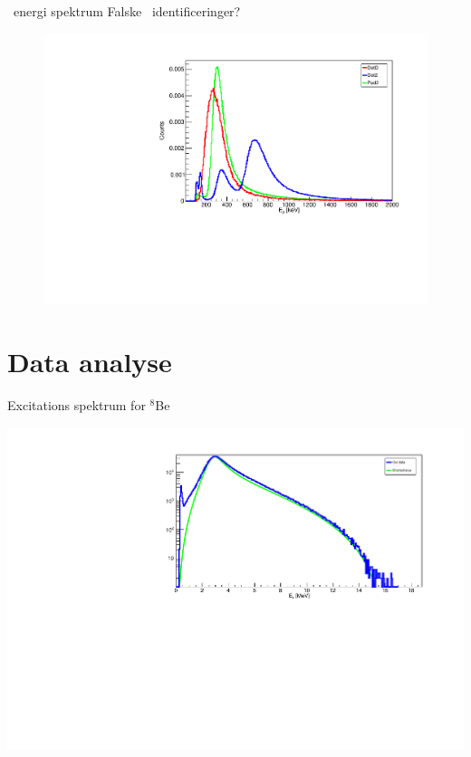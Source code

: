 \begin{frame}{\be\ energi spektrum}
	Falske \be\ identificeringer?
	\begin{figure}
		\includegraphics[width=.7\columnwidth]{../figures/betaSpec.pdf}
	\end{figure}
\end{frame}

\section{Data analyse}

\begin{frame}{Excitations spektrum for $^8$Be}
	\begin{itemize}
	\end{itemize}

	\includegraphics[width=.8\columnwidth]{../figures/bataraCompare.pdf}
	
\end{frame}

